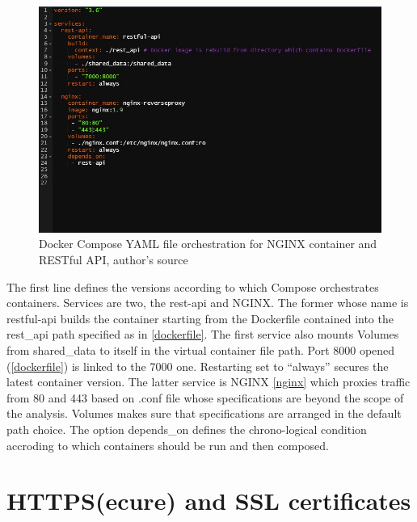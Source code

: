 \documentclass[
  12pt,
  a4paper,
  oneside]{book}
\theoremstyle{definition}
\theoremstyle{definition}
\theoremstyle{definition}
\theoremstyle{remark}
\begin{document}
\begin{figure}
\centering
\includegraphics{images/docker-compose.jpg}
\caption{\label{fig:Compose}Docker Compose YAML file orchestration for NGINX container and RESTful API, author's source}
\end{figure}

The first line defines the versions according to which Compose orchestrates containers. Services are two, the rest-api and NGINX. The former whose name is restful-api builds the container starting from the Dockerfile contained into the rest\_api path specified as in \ref{dockerfile}. The first service also mounts Volumes from shared\_data to itself in the virtual container file path. Port 8000 opened (\ref{dockerfile}) is linked to the 7000 one. Restarting set to ``always'' secures the latest container version.
The latter service is NGINX \ref{nginx} which proxies traffic from 80 and 443 based on .conf file whose specifications are beyond the scope of the analysis. Volumes makes sure that specifications are arranged in the default path choice. The option depends\_on defines the chrono-logical condition accroding to which containers should be run and then composed.

\hypertarget{HTTPS}{%
\section{HTTPS(ecure) and SSL certificates}\label{HTTPS}}
\end{document}
